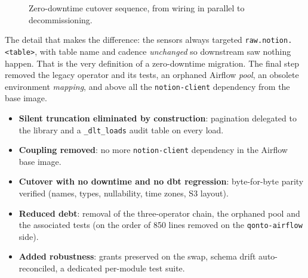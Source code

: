 \begin{figure}[H]
\centering
{}
\caption{Zero-downtime cutover sequence, from wiring in parallel to decommissioning.}
\label{fig:cutover}
\end{figure}

The detail that makes the difference: the sensors always targeted \texttt{raw.notion.<table>}, with table name and cadence \emph{unchanged} so downstream saw nothing happen. That is the very definition of a zero-downtime migration. The final step removed the legacy operator and its tests, an orphaned Airflow \emph{pool}, an obsolete environment \emph{mapping}, and above all the \texttt{notion-client} dependency from the base image.

\begin{keybox}
\begin{itemize}
  \item \textbf{Silent truncation eliminated by construction}: pagination delegated to the library and a \texttt{\_dlt\_loads} audit table on every load.
  \item \textbf{Coupling removed}: no more \texttt{notion-client} dependency in the Airflow base image.
  \item \textbf{Cutover with no downtime and no dbt regression}: byte-for-byte parity verified (names, types, nullability, time zones, S3 layout).
  \item \textbf{Reduced debt}: removal of the three-operator chain, the orphaned pool and the associated tests (on the order of 850 lines removed on the \texttt{qonto-airflow} side).
  \item \textbf{Added robustness}: grants preserved on the swap, schema drift auto-reconciled, a dedicated per-module test suite.
\end{itemize}
\end{keybox}

